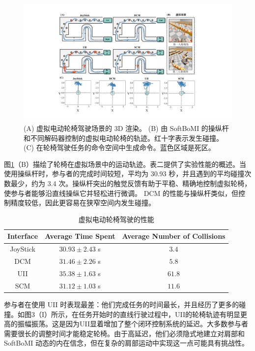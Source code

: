 \begin{figure}[!t]
    \includegraphics[width=1\textwidth]{figures/3-Fig-14.pdf}
    \caption{(A) 虚拟电动轮椅驾驶场景的 3D 渲染。 (B) 由 SoftBoMI 的操纵杆和不同解码器控制的虚拟电动轮椅的轨迹。红十字表示发生碰撞。 (C) 在轮椅驾驶任务的命令空间中生成命令。蓝色区域是死区。}
    \label{fig:3-14}
\end{figure}  

图\ref{fig:3-14}（B）描绘了轮椅在虚拟场景中的运动轨迹。表二提供了实验性能的概述。当使用操纵杆时，参与者的完成时间较短，平均为 30.93 秒，并且遇到的平均碰撞次数最少，约为 3.4 次。操纵杆突出的触觉反馈有助于平稳、精确地控制虚拟轮椅，使参与者能够沿直线操纵它并轻松进行微调。 DCM 的性能与操纵杆类似，但控制精度较低，因此更容易在狭窄空间内发生碰撞。  

\begin{table}
 \centering
 \caption{虚拟电动轮椅驾驶的性能  }
 \setlength{\tabcolsep}{5pt}
 \begin{tabular}{c c c}
 \hline\hline
  Interface & Average Time Spent & Average Number of Collisions  \\  
 \hline
 JoyStick&        $30.93\pm 2.43$        s&        $3.4$         \\ 
 DCM&        $31.46\pm 2.26$        s&        $5.8$         \\ 
 UII&        $35.38\pm 1.63$        s&        $61.8$         \\ 
 SCM&        $31.12\pm 1.03$        s&        $11.6$         \\  
 \hline\hline
 \end{tabular}
 \label{tab3-2}
\end{table}     

参与者在使用 UII 时表现最差：他们完成任务的时间最长，并且经历了更多的碰撞。如图3（I）所示，在任务开始时的直线行驶过程中，UII的轮椅轨迹有明显更高的振幅振荡。这是因为UII显着增加了整个闭环控制系统的延迟。大多数参与者需要很长的调整时间才能稳定轮椅。由于高延迟，他们必须隐式地建立对肩部和 SoftBoMI 动态的内在信念，但在复杂的肩部运动中实现这一点可能具有挑战性。  

